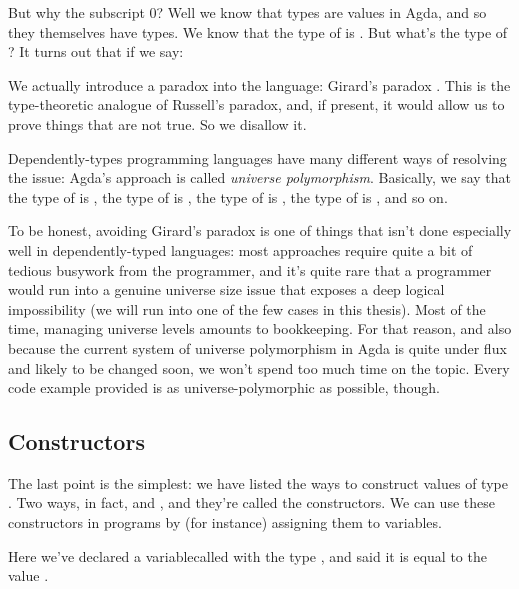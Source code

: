 But why the subscript 0?
Well we know that types are values in Agda, and so they themselves have types.
We know that the type of  is
.
But what's the type of ?
It turns out that if we say:
We actually introduce a paradox into the language: Girard's paradox
\citep{girardInterpretationFonctionelleElimination1972}.
This is the type-theoretic analogue of Russell's paradox, and, if present, it
would allow us to prove things that are not true.
So we disallow it.

Dependently-types programming languages have many different ways of resolving
the issue: Agda's approach is called \emph{universe polymorphism}.
Basically, we say that the type of  is
, the type of  is
, the type of 
is , the type of 
is , and so on.

To be honest, avoiding Girard's paradox is one of things that isn't done
especially well in dependently-typed languages: most approaches require quite a
bit of tedious busywork from the programmer, and it's quite rare that a
programmer would run into a genuine universe size issue that exposes a deep
logical impossibility (we will run into one of the few cases in this thesis).
Most of the time, managing universe levels amounts to bookkeeping.
For that reason, and also because the current system of universe polymorphism in
Agda is quite under flux and likely to be changed soon, we won't spend too much
time on the topic.
Every code example provided is as universe-polymorphic as possible, though.

\subsection{Constructors}
The last point is the simplest: we have listed the ways to construct values of
type .
Two ways, in fact,  and
, and they're called the constructors.
We can use these constructors in programs by (for instance) assigning them to
variables.
\begin{multicols}{2}\centering
  \columnbreak
\end{multicols}\vspace{-2\baselineskip}\noindent
Here we've declared a variable\footnotemark\;called  with
the type , and said it is equal to the value
.

